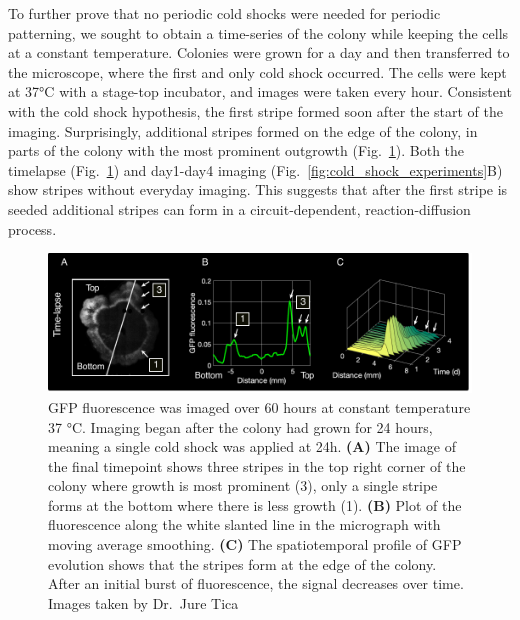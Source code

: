 To further prove that no periodic cold shocks were needed for periodic patterning, we sought to obtain a time-series of the colony while keeping the cells at a constant temperature.
Colonies were grown for a day and then transferred to the microscope, where the first and only cold shock occurred.
The cells were kept at 37°C with a stage-top incubator, and images were taken every hour.
Consistent with the cold shock hypothesis, the first stripe formed soon after the start of the imaging.
Surprisingly, additional stripes formed on the edge of the colony, in parts of the colony with the most prominent outgrowth (Fig.~\ref{fig:microscopy_timeseries}).
Both the timelapse (Fig.~\ref{fig:microscopy_timeseries}) and day1-day4 imaging (Fig.~\ref{fig:cold_shock_experiments}B) show stripes without everyday imaging.
This suggests that after the first stripe is seeded additional stripes can form in a circuit-dependent, reaction-diffusion process.


\begin{figure}[H] %
    \centering
    \begin{adjustbox}{center}
        \includegraphics[width=1\textwidth]{chapters/Chapter 3/microscopy_timeseries} %
    \end{adjustbox}
    \caption{GFP fluorescence was imaged over 60 hours at constant temperature 37 °C. Imaging began after the colony had grown for 24 hours, meaning a single cold shock was applied at 24h. \textbf{(A)} The image of the final timepoint shows three stripes in the top right corner of the colony where growth is most prominent (3), only a single stripe forms at the bottom where there is less growth (1). \textbf{(B)} Plot of the fluorescence along the white slanted line in the micrograph with moving average smoothing. \textbf{(C)} The spatiotemporal profile of GFP evolution shows that the stripes form at the edge of the colony. After an initial burst of fluorescence, the signal decreases over time. Images taken by Dr.~Jure Tica}
    \label{fig:microscopy_timeseries}
\end{figure}



